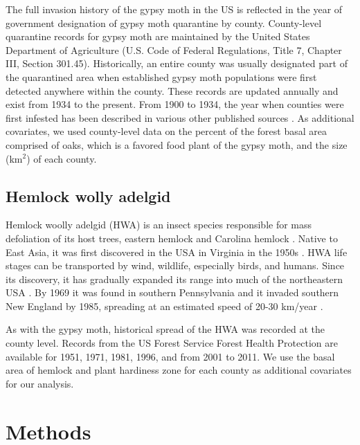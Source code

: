 \documentclass[12pt]{article}
\begin{document}
The full invasion history of the gypsy moth in the US is reflected in the year of government designation of gypsy moth quarantine by county. County-level quarantine records for gypsy moth are maintained by the United States Department of Agriculture (U.S. Code of Federal Regulations, Title 7, Chapter III, Section 301.45). Historically, an entire county was usually designated part of the quarantined area when established gypsy moth populations were first detected anywhere within the county. These records are updated annually and exist from 1934 to the present. From 1900 to 1934, the year when counties were first infested has been described in various other published sources \citep[e.g.,][]{ burgess1913report, burgess1915report, liebhold1992gypsy}.  As additional covariates, we used county-level data \citep{liebhold1997gypsy} on the percent of the forest basal area comprised of oaks, which is a favored food plant of the gypsy moth, and the size (km$^2$) of each county.



\subsection{Hemlock wolly adelgid}

Hemlock woolly adelgid (HWA) is an insect species responsible for mass defoliation of its host trees, eastern hemlock and Carolina hemlock \citep{orwig2002landscape,morin2009anisotropic}. Native to East Asia, it was first discovered in the USA in Virginia in the 1950s \citep{ward2004eastern}.  HWA life stages can be transported by wind, wildlife, especially birds, and humans. Since its discovery, it has gradually expanded its range into much of the northeastern USA \citep{evans2007geographically,morin2009anisotropic}. By 1969 it was found in southern Pennsylvania and it invaded southern New England by 1985, spreading at an estimated speed of 20-30 km/year \citep{morin2009anisotropic}.

As with the gypsy moth, historical spread of the HWA was recorded at the county level. Records from the US Forest Service Forest Health Protection are available for 1951, 1971, 1981, 1996, and from 2001 to 2011.   We use the basal area of hemlock \citep{morin2004mapping} and plant hardiness zone \citep{cathey1990usda} for each county as additional covariates for our analysis.


\section{Methods} \label{sec:methods}
\end{document}
